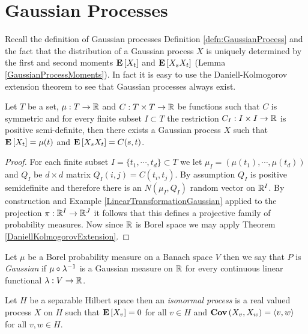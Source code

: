 \chapter{Gaussian Processes}

Recall the definition of Gaussian processes Definition \ref{defn:GaussianProcess} and the fact that the distribution of a Gaussian process $X$ is uniquely 
determined by the first and second moments $\textbf{E}\left[X_t\right]$ and $\textbf{E}\left[X_s X_t\right]$ (Lemma \ref{GaussianProcessMoments}).  In fact it is easy to use 
the Daniell-Kolmogorov extension theorem to see that Gaussian processes always exist. 

\begin{prop}\label{ExistenceGaussianProcess}Let $T$ be a set, $\mu : T \to \mathbb{R}$ and $C : T \times T \to \mathbb{R}$ be functions such that $C$ is symmetric and for every finite subset $I \subset T$ the restriction $C_I : I \times I \to \mathbb{R}$ is positive semi-definite, then there exists a Gaussian process $X$ such that $\textbf{E}\left[X_t\right] = \mu(t)$ and $\textbf{E}\left[X_s X_t\right] = C(s,t)$.
\end{prop}
\begin{proof}
For each finite subset $I = \lbrace t_1, \cdots, t_d \rbrace \subset T$ we let $\mu_I = (\mu(t_1), \cdots, \mu(t_d))$ and $Q_I$ be $d \times d$ matrix $Q_I(i,j) = C(t_i,t_j)$.  By assumption $Q_I$ is positive semidefinite and therefore there is an $N(\mu_I, Q_I)$ random vector on $\mathbb{R}^I$.  By construction and Example \ref{LinearTransformationGaussian} applied to the projection $\pi : \mathbb{R}^I \to \mathbb{R}^J$ it follows that this defines a projective family of probability measures.  Now since $\mathbb{R}$ is Borel space we may apply Theorem \ref{DaniellKolmogorovExtension}.
\end{proof}

\begin{defn}Let $\mu$ be a Borel probability measure on a Banach space $V$ then we say that $P$ is \emph{Gaussian} if $\mu \circ \lambda^{-1}$ is a Gaussian measure on $\mathbb{R}$ for every continuous linear functional $\lambda : V \to \mathbb{R}$.
\end{defn}

\begin{defn}Let $H$ be a separable Hilbert space then an \emph{isonormal process} is a real valued process $X$ on $H$ such that $\textbf{E}\left[X_v\right] = 0$ for all $v \in H$ and $\textbf{Cov} \left (X_v, X_w \right ) = \langle v, w \rangle$ for all $v,w \in H$.
\end{defn}



